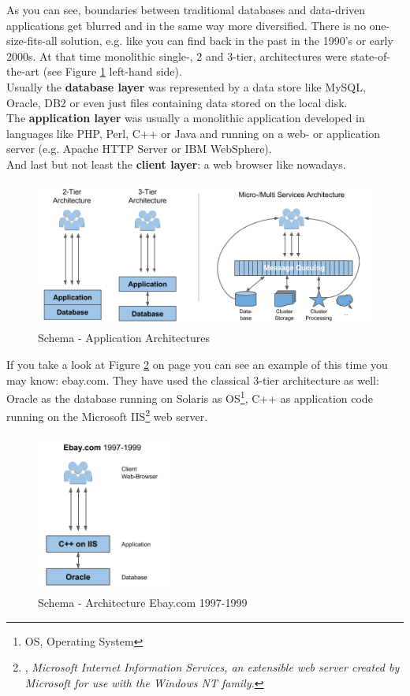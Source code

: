 As you can see, boundaries between traditional databases and data-driven applications get blurred and in the same way more diversified. 
There is no one-size-fits-all solution, e.g. like you can find back in the past in the 1990's or early 2000s. 
At that time monolithic single-, 2 and 3-tier, architectures were state-of-the-art (see Figure \ref{schema_application_architectures} left-hand side). \\
Usually the \textbf{database layer} was represented by a data store like MySQL, Oracle, DB2 or even just files containing data stored on the local disk.\\
The \textbf{application layer} was usually a monolithic application developed in languages like PHP, Perl, C++ or Java and running on a web- or application server (e.g. Apache HTTP Server or IBM WebSphere).\\
And last but not least the \textbf{client layer}: a web browser like nowadays.\\
\begin{figure}[ht]
	\centering
  \includegraphics[width=1\textwidth]{application_architectures.png}
	\caption{Schema - Application Architectures}
	\label{schema_application_architectures}
\end{figure}
If you take a look at Figure \ref{schema_ebay_architecture_1997_1999} on page \pageref{schema_ebay_architecture_1997_1999} you can see an example of this time you may know: ebay.com. They have used the classical 3-tier architecture as well: Oracle as the database running on Solaris as OS\footnote{OS, Operating System}, C++ as application code running on the Microsoft IIS\footnote{\cite{IIS}, \textit{Microsoft Internet Information Services, an extensible web server created by Microsoft for use with the Windows NT family.}} web server.
\begin{figure}[ht]
	\centering
  \includegraphics[width=0.4\textwidth]{ebay_architecture_199799.png}
	\caption{Schema - Architecture Ebay.com 1997-1999}
	\label{schema_ebay_architecture_1997_1999}
\end{figure}
